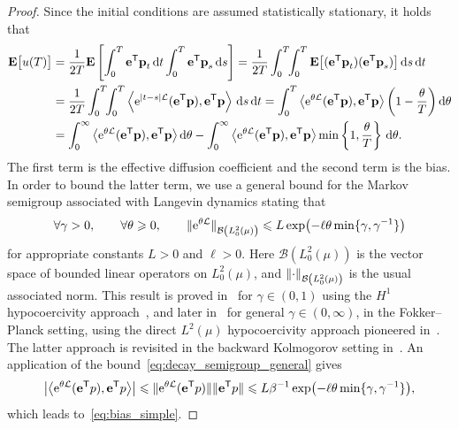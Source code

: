 \documentclass[11pt,a4paper]{article}
\begin{document}
\begin{proof}
Since the initial conditions are assumed statistically stationary,
it holds that
\begin{equation}
\label{eq:bias_without_control}
\begin{aligned}[b]
    \expect \bigl[u(T)\bigr]
    &= \frac{1}{2T} \expect \left[ \int_{0}^{T} \vect e^\t \vect p_{t} \, \d t \int_{0}^{T} \vect e^\t \vect p_s \, \d s \right]
    = \frac{1}{2T}  \int_{0}^{T} \!\! \int_{0}^{T} \expect \bigl[ (\vect e^\t \vect p_t) (\vect e^\t \vect p_s) \bigr] \, \d s \, \d t  \\
    &= \frac{1}{2T}  \int_{0}^{T} \!\! \int_{0}^{T} \ip{\e^{\abs{t - s} \mathcal L}(\vect e^\t \vect p)}{\vect e^\t \vect p} \, \d s \, \d t
    =  \int_{0}^{T} \ip{\e^{\theta \mathcal L} (\vect e^\t \vect p)}{\vect e^\t \vect p} \left(1 - \frac{\theta}{T}\right) \d \theta  \\
    &= \int_{0}^{\infty} \ip{\e^{\theta \mathcal L}(\vect e^\t \vect p)}{\vect e^\t \vect p}  \d \theta
    - \int_{0}^{\infty} \ip{\e^{\theta \mathcal L} (\vect e^\t \vect p)}{\vect e^\t \vect p} \min\left\{1, \frac{\theta}{T}\right\} \, \d \theta.
\end{aligned}
\end{equation}
The first term is the effective diffusion coefficient
and the second term is the bias.
In order to bound the latter term,
we use a general bound for the Markov semigroup associated with Langevin dynamics
stating that
\begin{equation}
    \label{eq:decay_semigroup_general}
    \forall \gamma > 0, \qquad \forall \theta \geq 0, \qquad
    \norm*{ \e^{\theta \mathcal L} }[\mathcal B \left(L^2_0\left(\mu\right) \right)] \leq L \exp \bigl(- \ell \theta \min\{\gamma, \gamma^{-1}\} \bigr)
\end{equation}
for appropriate constants $L > 0$ and $\ell > 0$.
Here $\mathcal B\left(L^2_0(\mu)\right)$ is the vector space of bounded linear operators on $L^2_0(\mu)$,
and $\norm{\cdot}_{\mathcal B\left(L^2_0(\mu)\right)}$ is the usual associated norm.
This result is proved in~\cite{MR2394704} for $\gamma \in (0, 1)$ using the $H^1$ hypocoercivity approach~\cite{MR2562709},
and later in~\cite{MR3106879} for general $\gamma \in (0, \infty)$, in the Fokker--Planck setting,
using the direct $L^2(\mu)$ hypocoercivity approach pioneered in~\cite{MR2576899,MR3324910}.
The latter approach is revisited in the backward Kolmogorov setting in~\cite{MR3522857,roussel2018spectral}.
An application of the bound~\eqref{eq:decay_semigroup_general} gives
\begin{equation}
    \label{eq:initial_bound_velocity_autocorrelation}
    \left\lvert \ip{\e^{\theta \mathcal L}(\vect e^\t p)}{\vect e^\t p} \right\rvert
    \leq \norm*{\e^{\theta \mathcal L}(\vect e^\t p)} \norm*{\vect e^\t p}
    \leq L \beta^{-1} \exp\bigl(- \ell \theta \min\{\gamma, \gamma^{-1}\}\bigr),
\end{equation}
which leads to~\eqref{eq:bias_simple}.
\end{proof}
\end{document}
